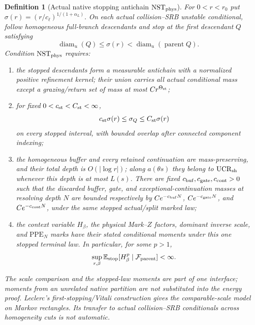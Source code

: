 \documentclass[11pt]{article}
\newtheorem{definition}[theorem]{Definition}
\begin{document}
\begin{definition}[Actual native stopping antichain
$\mathrm{NST}_{\rm phys}$]
\label{def:actual-native-stopping}
For $0<r<r_0$ put
\(
 \sigma(r)=(r/c_\ell)^{1/(1+\alpha_L)}.
\)
On each actual collision--SRB unstable conditional, follow homogeneous
full-branch descendants and stop at the first descendant $Q$ satisfying
\begin{equation}
\label{eq:native-first-stopping-rule}
 \operatorname{diam}_u(Q)\le\sigma(r)
 <\operatorname{diam}_u(\operatorname{parent}Q).
\end{equation}
Condition $\mathrm{NST}_{\rm phys}$ requires:
\begin{enumerate}[label=\textup{(NST\arabic*)}]
\item the stopped descendants form a measurable antichain with a normalized
      positive refinement kernel; their union carries all actual conditional
      mass except a grazing/return set of mass at most $Cr^{\Theta_{\rm st}}$;
\item for fixed $0<c_{\rm st}<C_{\rm st}<\infty$,
      \begin{equation}
      \label{eq:native-stopping-comparability}
       c_{\rm st}\sigma(r)\le\sigma_Q
       \le C_{\rm st}\sigma(r)
      \end{equation}
      on every stopped interval, with bounded overlap after connected
      component indexing;
\item the homogeneous buffer and every retained continuation are
      mass-preserving, and their total depth is $O(|\log r|)$; along
      $a(\theta s)$ they belong to $\mathrm{UCR}_{\rm sh}$ whenever this
      depth is at most $L(s)$.  There are fixed
      $c_{\rm buf},c_{\rm gate},c_{\rm cont}>0$ such that the discarded
      buffer, gate, and exceptional-continuation masses at resolving depth
      $N$ are bounded respectively by
      $Ce^{-c_{\rm buf}N}$, $Ce^{-c_{\rm gate}N}$, and
      $Ce^{-c_{\rm cont}N}$, under the same stopped actual/split marked law;
\item the context variable $H_\beta$, the physical Mark--$Z$ factors,
      dominant inverse scale, and $\mathrm{PPE}_{N}$ marks have their stated
      conditional moments under this one stopped terminal law.  In
      particular, for some $p>1$,
      \begin{equation}
      \label{eq:stopped-H-moment}
       \sup_{r,\beta}
       \mathbb E_{\rm stop}[H_\beta^p\mid\mathcal F_{\rm parent}]<\infty .
      \end{equation}
\end{enumerate}
The scale comparison and the stopped-law moments are part of one interface;
moments from an unrelated native partition are not substituted into the
energy proof.  Leclerc's first-stopping/Vitali construction
\cite[Section~4]{Leclerc2026} gives the comparable-scale model on Markov
rectangles.  Its transfer to actual
collision--SRB conditionals across homogeneity cuts is not automatic.
\end{definition}
\end{document}
